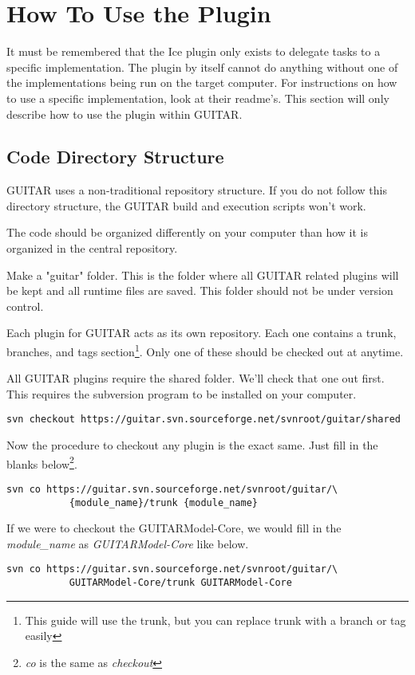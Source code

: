 
\section{How To Use the Plugin}

It must be remembered that the Ice plugin only exists to delegate tasks to a specific implementation. The plugin by itself cannot do anything without one of the implementations being run on the target computer. For instructions on how to use a specific implementation, look at their readme's. This section will only describe how to use the plugin within GUITAR.

\subsection{Code Directory Structure}

GUITAR uses a non-traditional repository structure. If you do not follow this directory structure, the GUITAR build and execution scripts won't work.

The code should be organized differently on your computer than how it is organized in the central repository.

Make a "guitar" folder. This is the folder where all GUITAR related plugins will be kept and all runtime files are saved. This folder should not be under version control.

Each plugin for GUITAR acts as its own repository. Each one contains a trunk, branches, and tags section\footnote{This guide will use the trunk, but you can replace trunk with a branch or tag easily}. Only one of these should be checked out at anytime.

All GUITAR plugins require the shared folder. We'll check that one out first. This requires the subversion program to be installed on your computer.

\begin{verbatim}
svn checkout https://guitar.svn.sourceforge.net/svnroot/guitar/shared
\end{verbatim}

Now the procedure to checkout any plugin is the exact same. Just fill in the blanks below\footnote{\emph{co} is the same as \emph{checkout}}.
\begin{verbatim}
svn co https://guitar.svn.sourceforge.net/svnroot/guitar/\
           {module_name}/trunk {module_name}
\end{verbatim}

If we were to checkout the GUITARModel-Core, we would fill in the \emph{module\_name} as \emph{GUITARModel-Core} like below.
\begin{verbatim}
svn co https://guitar.svn.sourceforge.net/svnroot/guitar/\
           GUITARModel-Core/trunk GUITARModel-Core
\end{verbatim}

